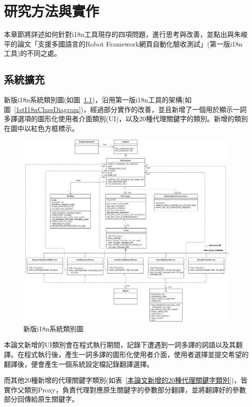\chapter{研究方法與實作}
本章節將詳述如何針對i18n工具現存的四項問題，進行思考與改善，並點出與朱峻平的論文「支援多國語言的Robot Framework網頁自動化驗收測試」(第一版i18n工具)的不同之處。

\section{系統擴充}
新版i18n系統類別圖(如圖~\ref{新版i18n系統類別圖})，沿用第一版i18n工具的架構(如圖~\ref{1stI18nClassDiagram})，經過部分實作的改善，並且新增了一個用於顯示一詞多譯選項的圖形化使用者介面類別(UI)，以及20種代理關鍵字的類別。新增的類別在圖中以紅色方框標示。

\begin{figure}[H]
\flushleft
\includegraphics[width= 180mm]{../UML/i18n class diagram-i18n class diagram.png}
\caption{新版i18n系統類別圖}
\label{新版i18n系統類別圖}
\end{figure}

本論文新增的UI類別會在程式執行期間，記錄下遭遇到一詞多譯的詞語以及其翻譯。在程式執行後，產生一詞多譯的圖形化使用者介面，使用者選擇並提交希望的翻譯後，便會產生一個系統設定檔記錄翻譯選擇。

而其他20種新增的代理關鍵字類別(如表~\ref{本論文新增的20種代理關鍵字類別})，皆實作父類別Proxy，負責代理對應原生關鍵字的參數部分翻譯，並將翻譯好的參數部分回傳給原生關鍵字。

